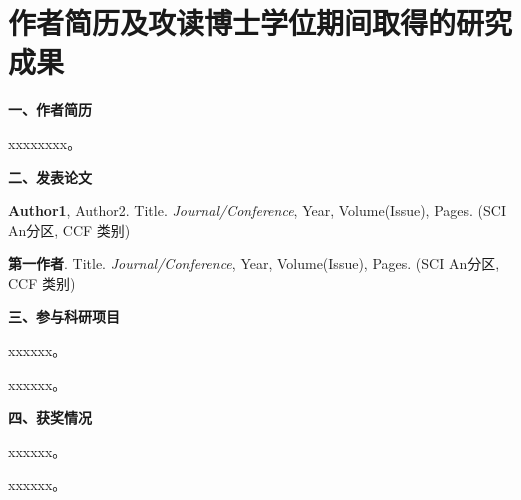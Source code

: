 \setlength{\baselineskip}{16pt}
\chapter{作者简历及攻读博士学位期间取得的研究成果}
\setlength{\parindent}{0pt}


\textbf{一、作者简历}
\vspace{10pt}


xxxxxxxx。



\vspace{10pt}
\textbf{二、发表论文}
\vspace{10pt}

\begin{enumerate}[leftmargin=*, parsep=5pt, label={[\arabic*]}]

	\item \textbf{Author1}, Author2. Title. \emph{Journal/Conference}, Year, Volume(Issue), Pages. (SCI An分区, CCF 类别)
	
	\item \textbf{第一作者}. Title. \emph{Journal/Conference}, Year, Volume(Issue), Pages. (SCI An分区, CCF 类别)
	
\end{enumerate}



\vspace{10pt}
\textbf{三、参与科研项目}
\vspace{10pt}

\begin{enumerate}[leftmargin=*, parsep=5pt, label={[\arabic*]}]
	
	\item xxxxxx。
	
	\item xxxxxx。

\end{enumerate}



\vspace{10pt}
\textbf{四、获奖情况}
\vspace{10pt}

\begin{enumerate}[leftmargin=*, parsep=5pt, label={[\arabic*]}]
	
	\item xxxxxx。
	
	\item xxxxxx。
	
\end{enumerate}


